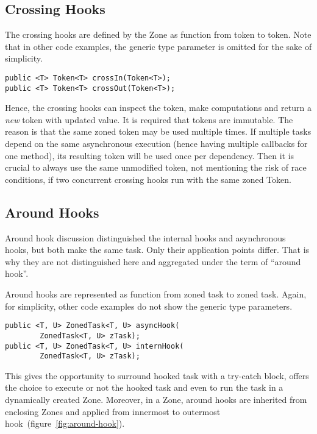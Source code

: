 \subsection*{Crossing Hooks}

The crossing hooks are defined by the Zone as function from token to token. Note that in other code examples, the generic type parameter is omitted for the sake of simplicity.

\begin{lstlisting}
public <T> Token<T> crossIn(Token<T>);
public <T> Token<T> crossOut(Token<T>);
\end{lstlisting}

Hence, the crossing hooks can inspect the token, make computations and return a \emph{new} token with updated value. It is required that tokens are immutable. The reason is that the same zoned token may be used multiple times. If multiple tasks depend on the same asynchronous execution (hence having multiple callbacks for one method), its resulting token will be used once per dependency. Then it is crucial to always use the same unmodified token, not mentioning the risk of race conditions, if two concurrent crossing hooks run with the same zoned Token.

\subsection*{Around Hooks}

Around hook discussion distinguished the internal hooks and asynchronous hooks, but both make the same task. Only their application points differ. That is why they are not distinguished here and aggregated under the term of ``around hook''.

Around hooks are represented as function from zoned task to zoned task. Again, for simplicity, other code examples do not show the generic type parameters.

\begin{lstlisting}
public <T, U> ZonedTask<T, U> asyncHook(
        ZonedTask<T, U> zTask);
public <T, U> ZonedTask<T, U> internHook(
        ZonedTask<T, U> zTask);
\end{lstlisting}

This gives the opportunity to surround hooked task with a try-catch block, offers the choice to execute or not the hooked task and even to run the task in a dynamically created Zone. Moreover, in a Zone, around hooks are inherited from enclosing Zones and applied from innermost to outermost hook~(figure~\ref{fig:around-hook}).

